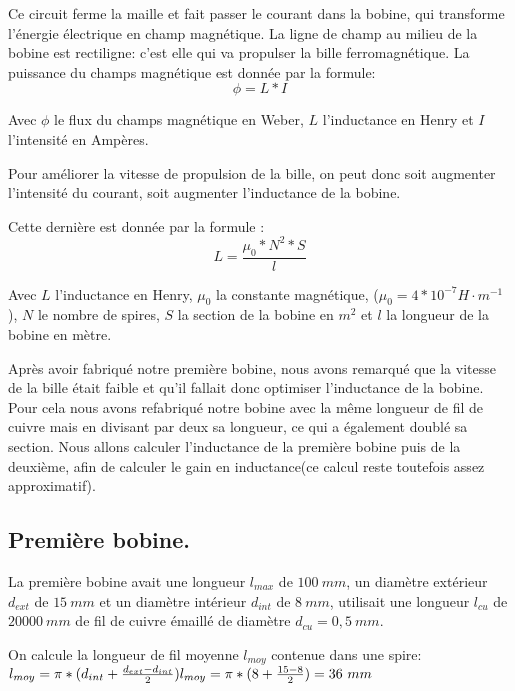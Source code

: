 Ce circuit ferme la maille et fait passer le courant dans la
bobine, qui transforme l'énergie électrique en champ
magnétique. La ligne de champ au milieu de la bobine est
rectiligne: c'est elle qui va propulser la bille
ferromagnétique. La puissance du champs magnétique est donnée
par la formule:
\begin{equation}
	\phi = L*I
\end{equation}

Avec $\phi$ le flux du champs magnétique en Weber, $L$ l'inductance
en Henry et $I$ l'intensité en Ampères.

Pour améliorer la vitesse de propulsion de la bille, on peut
donc soit   augmenter l'intensité du courant, soit augmenter
l'inductance de la   bobine.

Cette dernière est donnée par la formule :
\begin{equation}
	L=\frac{\mu_0*N^2*S}{l}
\end{equation}

Avec $L$ l'inductance en Henry, $\mu_0$ la constante magnétique, ($\mu_0=4*10^{-7} H·m^{-1}$ ), $N$ le nombre de
spires, $S$ la section de la bobine en $m^2$ et $l$   la longueur de
la bobine en mètre.

Après avoir fabriqué notre première bobine, nous avons remarqué
que   la vitesse de la bille était faible et qu'il fallait donc
optimiser   l'inductance de la bobine. Pour cela nous avons
refabriqué notre bobine   avec la même longueur de fil de
cuivre mais en divisant par deux sa   longueur, ce qui a
également doublé sa section. Nous allons calculer
l'inductance de la première bobine puis de la deuxième, afin de
calculer   le gain en inductance(ce calcul reste toutefois
assez approximatif).

\subsection{Première bobine.}
La première bobine avait une longueur $l_{max}$ de $100\ mm$, un
diamètre   extérieur $d_{ext}$ de $15\ mm$ et un diamètre intérieur
$d_{int}$ de $8\ mm$,   utilisait une longueur $l_{cu}$ de $20000\ mm$ de fil
de cuivre émaillé de   diamètre $d_{cu}=0,5\ mm$.

On calcule la longueur de fil moyenne $l_{moy}$ contenue dans une
spire: \\
\begin{math}
	l_{moy}= \pi*(d_{int}+\frac{d_{ext}-d_{int}}{2}) \\
	l_{moy}=\pi*(8+\frac{15-8}{2})=36\ mm
\end{math}


